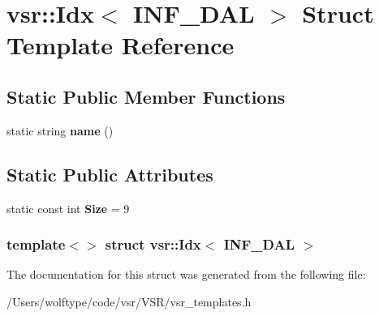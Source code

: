 \hypertarget{structvsr_1_1_idx_3_01_i_n_f___d_a_l_01_4}{\section{vsr\-:\-:Idx$<$ I\-N\-F\-\_\-\-D\-A\-L $>$ Struct Template Reference}
\label{structvsr_1_1_idx_3_01_i_n_f___d_a_l_01_4}
}
\subsection*{Static Public Member Functions}
\begin{DoxyCompactItemize}
\item 
\hypertarget{structvsr_1_1_idx_3_01_i_n_f___d_a_l_01_4_ab0cb0f974cfdb9bc95f380735aa1bc0e}{static string {\bfseries name} ()}\label{structvsr_1_1_idx_3_01_i_n_f___d_a_l_01_4_ab0cb0f974cfdb9bc95f380735aa1bc0e}

\end{DoxyCompactItemize}
\subsection*{Static Public Attributes}
\begin{DoxyCompactItemize}
\item 
\hypertarget{structvsr_1_1_idx_3_01_i_n_f___d_a_l_01_4_aa531eb1d3fa7828f5a7a0e4ad0326108}{static const int {\bfseries Size} = 9}\label{structvsr_1_1_idx_3_01_i_n_f___d_a_l_01_4_aa531eb1d3fa7828f5a7a0e4ad0326108}

\end{DoxyCompactItemize}
\subsubsection*{template$<$$>$ struct vsr\-::\-Idx$<$ I\-N\-F\-\_\-\-D\-A\-L $>$}



The documentation for this struct was generated from the following file\-:\begin{DoxyCompactItemize}
\item 
/\-Users/wolftype/code/vsr/\-V\-S\-R/vsr\-\_\-templates.\-h\end{DoxyCompactItemize}
